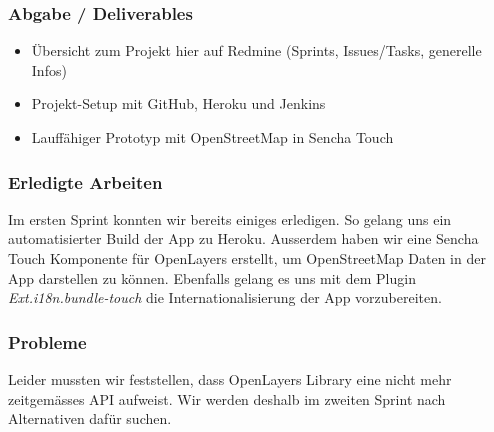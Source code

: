 \subsubsection{Abgabe / Deliverables}

\begin{itemize}
	\item Übersicht zum Projekt hier auf Redmine (Sprints, Issues/Tasks, generelle Infos)
	\item Projekt-Setup mit GitHub, Heroku und Jenkins
	\item Lauffähiger Prototyp mit OpenStreetMap in Sencha Touch
\end{itemize}

\subsubsection{Erledigte Arbeiten}
Im ersten Sprint konnten wir bereits einiges erledigen. So gelang uns ein automatisierter Build der App zu Heroku. Ausserdem haben wir eine Sencha Touch Komponente für OpenLayers erstellt, um OpenStreetMap Daten in der App darstellen zu können. Ebenfalls gelang es uns mit dem Plugin \emph{Ext.i18n.bundle-touch} die Internationalisierung der App vorzubereiten.

\subsubsection{Probleme}
Leider mussten wir feststellen, dass OpenLayers Library eine nicht mehr zeitgemässes \gls{API} aufweist. Wir werden deshalb im zweiten Sprint nach Alternativen dafür suchen.
